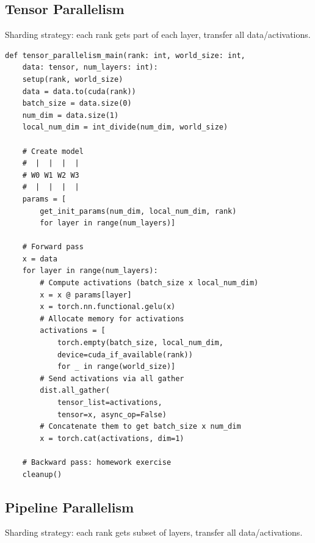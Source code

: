 \documentclass[12pt,twoside]{article}
\begin{document}
\subsection*{Tensor Parallelism}

Sharding strategy: each rank gets part of each layer, transfer all data/activations.

\begin{verbatim}
def tensor_parallelism_main(rank: int, world_size: int, 
    data: tensor, num_layers: int):
    setup(rank, world_size)  
    data = data.to(cuda(rank))
    batch_size = data.size(0)  
    num_dim = data.size(1)  
    local_num_dim = int_divide(num_dim, world_size) 
    
    # Create model
    #  |  |  |  |
    # W0 W1 W2 W3
    #  |  |  |  |
    params = [
        get_init_params(num_dim, local_num_dim, rank) 
        for layer in range(num_layers)]
    
    # Forward pass
    x = data
    for layer in range(num_layers):
        # Compute activations (batch_size x local_num_dim)
        x = x @ params[layer]
        x = torch.nn.functional.gelu(x)
        # Allocate memory for activations
        activations = [
            torch.empty(batch_size, local_num_dim, 
            device=cuda_if_available(rank)) 
            for _ in range(world_size)]
        # Send activations via all gather
        dist.all_gather(
            tensor_list=activations, 
            tensor=x, async_op=False)
        # Concatenate them to get batch_size x num_dim
        x = torch.cat(activations, dim=1)
  
    # Backward pass: homework exercise
    cleanup()    
\end{verbatim}

\subsection*{Pipeline Parallelism}

Sharding strategy: each rank gets subset of layers, transfer all data/activations.
\end{document}
